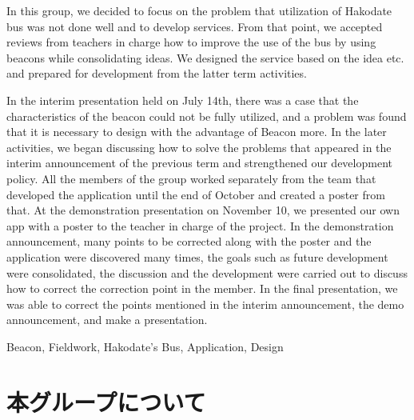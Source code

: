 \documentclass[openany,11pt,papersize]{jsbook}
\begin{document}
\begin{eabstract}

 

In this group, we decided to focus on the problem that utilization of Hakodate bus was not done well and to develop services.
From that point, we accepted reviews from teachers in charge how to improve the use of the bus by using beacons while consolidating ideas.
We designed the service based on the idea etc. and prepared for development from the latter term activities.

In the interim presentation held on July 14th, there was a case that the characteristics of the beacon could not be fully utilized, and a problem was found that it is necessary to design with the advantage of Beacon more.
In the later activities, we began discussing how to solve the problems that appeared in the interim announcement of the previous term and strengthened our development policy.
All the members of the group worked separately from the team that developed the application until the end of October and created a poster from that.
At the demonstration presentation on November 10, we presented our own app with a poster to the teacher in charge of the project.
In the demonstration announcement, many points to be corrected along with the poster and the application were discovered many times, the goals such as future development were consolidated, the discussion and the development were carried out to discuss how to correct the correction point in the member.
In the final presentation, we was able to correct the points mentioned in the interim announcement, the demo announcement, and make a presentation.

\begin{ekeyword}
Beacon, Fieldwork, Hakodate's Bus, Application, Design
\end{ekeyword}
\end{eabstract}

  
  \tableofcontents%
  
  
  \mainmatter%
  
  
  
  
  
  
  \chapter{本グループについて}
\end{document}
